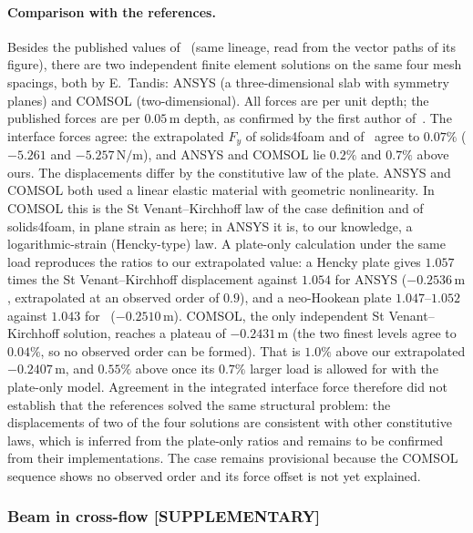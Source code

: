 \paragraph{Comparison with the references.}
Besides the published values of~\citet{Tukovic2018} (same lineage, read from the vector paths of its figure), there are two independent finite element solutions on the same four mesh spacings, both by E.~Tandis: ANSYS (a three-dimensional slab with symmetry planes) and COMSOL (two-dimensional). All forces are per unit depth; the published forces are per $0.05\,\mathrm{m}$ depth, as confirmed by the first author of~\citet{Tukovic2018}.
The interface forces agree: the extrapolated $F_y$ of solids4foam and of~\citet{Tukovic2018} agree to $0.07\%$ ($-5.261$ and $-5.257\,\mathrm{N/m}$), and ANSYS and COMSOL lie $0.2\%$ and $0.7\%$ above ours.
The displacements differ by the constitutive law of the plate. ANSYS and COMSOL both used a linear elastic material with geometric nonlinearity. In COMSOL this is the St Venant--Kirchhoff law of the case definition and of solids4foam, in plane strain as here; in ANSYS it is, to our knowledge, a logarithmic-strain (Hencky-type) law.
A plate-only calculation under the same load reproduces the ratios to our extrapolated value: a Hencky plate gives $1.057$ times the St Venant--Kirchhoff displacement against $1.054$ for ANSYS ($-0.2536\,\mathrm{m}$, extrapolated at an observed order of $0.9$), and a neo-Hookean plate $1.047$--$1.052$ against $1.043$ for~\citet{Tukovic2018} ($-0.2510\,\mathrm{m}$).
COMSOL, the only independent St Venant--Kirchhoff solution, reaches a plateau of $-0.2431\,\mathrm{m}$ (the two finest levels agree to $0.04\%$, so no observed order can be formed). That is $1.0\%$ above our extrapolated $-0.2407\,\mathrm{m}$, and $0.55\%$ above once its $0.7\%$ larger load is allowed for with the plate-only model.
Agreement in the integrated interface force therefore did not establish that the references solved the same structural problem: the displacements of two of the four solutions are consistent with other constitutive laws, which is inferred from the plate-only ratios and remains to be confirmed from their implementations. The case remains provisional because the COMSOL sequence shows no observed order and its force offset is not yet explained.

\subsubsection{Beam in cross-flow [SUPPLEMENTARY]}\label{sec:beam}

